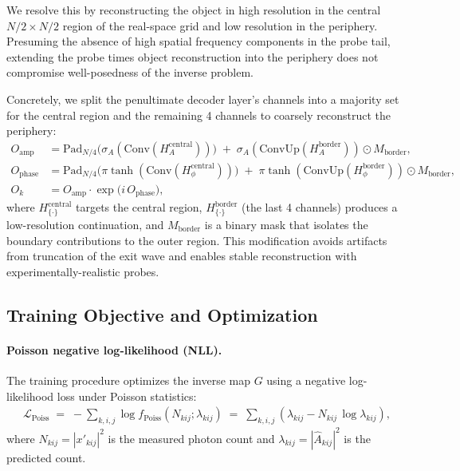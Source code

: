 \documentclass{optica-article}
\begin{document}
We resolve this by reconstructing the object in high resolution in the central $N/2 \times N/2$ region of the real-space grid and low resolution in the periphery. Presuming the absence of high spatial frequency components in the probe tail, extending the probe times object reconstruction into the periphery does not compromise well-posedness of the inverse problem.

Concretely, we split the penultimate decoder layer's channels into a majority set for the central region and the remaining 4 channels to coarsely reconstruct the periphery:
\begin{align}
  O_{\mathrm{amp}} &= \mathrm{Pad}_{N/4}\!\big(\sigma_A(\mathrm{Conv}(H^{\text{central}}_A))\big)\;+\;
  \sigma_A(\mathrm{ConvUp}(H^{\text{border}}_A))\odot M_{\text{border}},\\
  O_{\mathrm{phase}} &= \mathrm{Pad}_{N/4}\!\big(\pi \tanh(\mathrm{Conv}(H^{\text{central}}_\phi))\big)\;+\;
  \pi \tanh(\mathrm{ConvUp}(H^{\text{border}}_\phi))\odot M_{\text{border}},\\
  O_k &= O_{\mathrm{amp}}\cdot \exp\!\big(i\,O_{\mathrm{phase}}\big),
\end{align}
where $H^{\text{central}}_{\{\cdot\}}$ targets the central region, $H^{\text{border}}_{\{\cdot\}}$ (the last 4 channels) produces a low-resolution continuation, and $M_{\text{border}}$ is a binary mask that isolates the boundary contributions to the outer region. This modification avoids artifacts from truncation of the exit wave and enables stable reconstruction with experimentally-realistic probes.

\subsection{Training Objective and Optimization}
\label{sec:loss}

\paragraph{Poisson negative log-likelihood (NLL).}
The training procedure optimizes the inverse map $G$ using a negative log-likelihood loss under Poisson statistics:
\begin{align}
  \mathcal{L}_{\text{Poiss}}
  \;=\;
  -\sum_{k,i,j} \log f_{\text{Poiss}}(N_{kij}; \lambda_{kij})
  \;=\;
  \sum_{k,i,j}
  \left(
    \lambda_{kij} - N_{kij}\,\log\lambda_{kij}
  \right),
\end{align}
where $N_{kij} = |x'_{kij}|^2$ is the measured photon count and $\lambda_{kij}=|\hat{A}_{kij}|^2$ is the predicted count.
\end{document}
